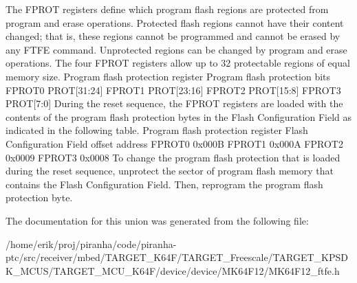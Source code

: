 The F\+P\+R\+OT registers define which program flash regions are protected from program and erase operations. Protected flash regions cannot have their content changed; that is, these regions cannot be programmed and cannot be erased by any F\+T\+FE command. Unprotected regions can be changed by program and erase operations. The four F\+P\+R\+OT registers allow up to 32 protectable regions of equal memory size. Program flash protection register Program flash protection bits F\+P\+R\+O\+T0 P\+R\+OT\mbox{[}31\+:24\mbox{]} F\+P\+R\+O\+T1 P\+R\+OT\mbox{[}23\+:16\mbox{]} F\+P\+R\+O\+T2 P\+R\+OT\mbox{[}15\+:8\mbox{]} F\+P\+R\+O\+T3 P\+R\+OT\mbox{[}7\+:0\mbox{]} During the reset sequence, the F\+P\+R\+OT registers are loaded with the contents of the program flash protection bytes in the Flash Configuration Field as indicated in the following table. Program flash protection register Flash Configuration Field offset address F\+P\+R\+O\+T0 0x000B F\+P\+R\+O\+T1 0x000A F\+P\+R\+O\+T2 0x0009 F\+P\+R\+O\+T3 0x0008 To change the program flash protection that is loaded during the reset sequence, unprotect the sector of program flash memory that contains the Flash Configuration Field. Then, reprogram the program flash protection byte. 

The documentation for this union was generated from the following file\+:\begin{DoxyCompactItemize}
\item 
/home/erik/proj/piranha/code/piranha-\/ptc/src/receiver/mbed/\+T\+A\+R\+G\+E\+T\+\_\+\+K64\+F/\+T\+A\+R\+G\+E\+T\+\_\+\+Freescale/\+T\+A\+R\+G\+E\+T\+\_\+\+K\+P\+S\+D\+K\+\_\+\+M\+C\+U\+S/\+T\+A\+R\+G\+E\+T\+\_\+\+M\+C\+U\+\_\+\+K64\+F/device/device/\+M\+K64\+F12/M\+K64\+F12\+\_\+ftfe.\+h\end{DoxyCompactItemize}

